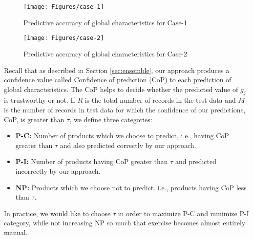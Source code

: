 \begin{figure}
\centering
\texttt{[image: Figures/case-1]}
\caption{Predictive accuracy of global characteristics for Case-1}
\label{fig:case-1}
\end{figure}

\begin{figure}
\centering
\texttt{[image: Figures/case-2]}
\caption{Predictive accuracy of global characteristics for Case-2}
\label{fig:case-2}
\end{figure}

Recall that as described in Section \ref{sec:ensemble}, our approach produces a confidence value called Confidence of prediction (CoP) to each prediction of global characteristics. The CoP helps to decide whether the predicted value of $g_j$ is trustworthy or not.  If $R$ is the total number of records in the test data and $M$ is the number of records in test data for which the confidence of our predictions, CoP, is greater than $\tau$, we define three categories:
\begin{itemize}
 \item \textbf{P-C:} Number of products which we choose to predict, i.e., having CoP greater than $\tau$ and also predicted correctly by our approach.
 \item \textbf{P-I:} Number of products having CoP greater than $\tau$  and predicted incorrectly by our approach.
 \item \textbf{NP:} Products which we choose not to predict. i.e., products having CoP less than $\tau$.
\end{itemize}

In practice, we would like to choose $\tau$ in order to maximize P-C and minimize P-I category, while not increasing NP so much that
exercise becomes almost entirely manual.

